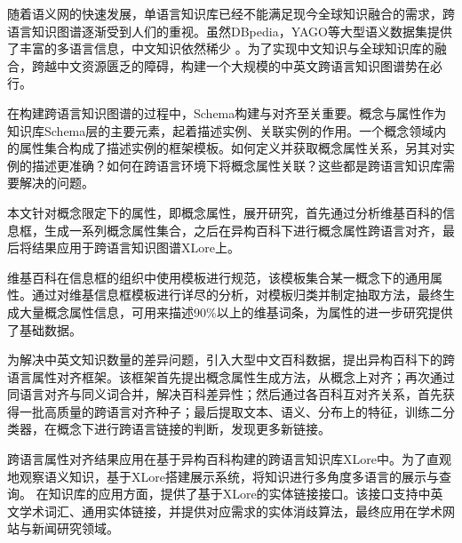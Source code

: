 \begin{cabstract}
随着语义网的快速发展，单语言知识库已经不能满足现今全球知识融合的需求，跨语言知识图谱逐渐受到人们的重视。虽然DBpedia，YAGO等大型语义数据集提供了丰富的多语言信息，中文知识依然稀少
。为了实现中文知识与全球知识库的融合，跨越中文资源匮乏的障碍，构建一个大规模的中英文跨语言知识图谱势在必行。

在构建跨语言知识图谱的过程中，Schema构建与对齐至关重要。概念与属性作为知识库Schema层的主要元素，起着描述实例、关联实例的作用。一个概念领域内的属性集合构成了描述实例的框架模板。如何定义并获取概念属性关系，另其对实例的描述更准确？如何在跨语言环境下将概念属性关联？这些都是跨语言知识库需要解决的问题。

本文针对概念限定下的属性，即概念属性，展开研究，首先通过分析维基百科的信息框，生成一系列概念属性集合，之后在异构百科下进行概念属性跨语言对齐，最后将结果应用于跨语言知识图谱XLore上。

维基百科在信息框的组织中使用模板进行规范，该模板集合某一概念下的通用属性。通过对维基信息框模板进行详尽的分析，对模板归类并制定抽取方法，最终生成大量概念属性信息，可用来描述90\%以上的维基词条，为属性的进一步研究提供了基础数据。

为解决中英文知识数量的差异问题，引入大型中文百科数据，提出异构百科下的跨语言属性对齐框架。该框架首先提出概念属性生成方法，从概念上对齐；再次通过同语言对齐与同义词合并，解决百科差异性；然后通过各百科互对齐关系，首先获得一批高质量的跨语言对齐种子；最后提取文本、语义、分布上的特征，训练二分类器，在概念下进行跨语言链接的判断，发现更多新链接。

跨语言属性对齐结果应用在基于异构百科构建的跨语言知识库XLore中。为了直观地观察语义知识，基于XLore搭建展示系统，将知识进行多角度多语言的展示与查询。 
在知识库的应用方面，提供了基于XLore的实体链接接口。该接口支持中英文学术词汇、通用实体链接，并提供对应需求的实体消歧算法，最终应用在学术网站与新闻研究领域。

\end{cabstract}


\begin{eabstract}
\end{eabstract}

